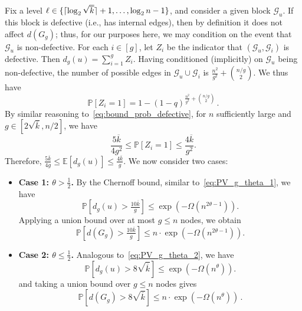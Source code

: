 \documentclass[journal]{IEEEtran}
\theoremstyle{definition}
\theoremstyle{definition}
\newcommand{\Gc}{\mathcal{G}}
\newcommand{\EE}{\mathbb{E}}
\newcommand{\PP}{\mathbb{P}}
\newcommand{\kb}{\overline{k}}
\DeclarePairedDelimiter\ceil{\lceil}{\rceil}
\begin{document}
Fix a level $\ell \in \{ \ceil{\log_2 \sqrt{\kb}}+1,\dots, \log_2 n -1 \}$, and consider a given block $\Gc_u$.  If this block is defective (i.e., has internal edges), then by definition it does not affect $d(G_g)$; thus, for our purposes here, we may condition on the event that $\Gc_u$ is non-defective.   
For each $i \in [g]$, let $Z_i$ be the indicator that $(\Gc_u,\Gc_i)$ is defective.  
Then $d_g(u) = \sum_{i=1}^g Z_i$.  
Having conditioned (implicitly) on $\Gc_u$ being non-defective, the number of possible edges in $\Gc_u \cup \Gc_i$ is $\tfrac{n^2}{g^2} + \binom{n/g}{2}$. We thus have 
\[
\PP[Z_i = 1] = 1 - (1-q)^{\tfrac{n^2}{g^2} + \binom{n/g}{2}} \, .
\] 
By similar reasoning to~\eqref{eq:bound_prob_defective}, for $n$ sufficiently large and $g \in [2\sqrt{\kb},n/2]$, we have
\[
  \frac{5\kb}{4g^2} \leq \PP[Z_i=1] \leq \frac{4\kb}{g^2}.
\]
Therefore, $\frac{5\kb}{4g} \leq \EE[d_g(u)] \leq \frac{4\kb}{g}$. We now consider two cases:
\begin{itemize}
    \item {
    \textbf{Case 1: $\theta > \tfrac{1}{2}$.} By the Chernoff bound, similar to~\eqref{eq:PV_g_theta_1}, we have
\[
  \PP \left[d_g(u) > \tfrac{10\kb}{g}\right] \leq \exp \left(-\Omega(n^{2\theta-1}) \right).
\]
Applying a union bound over at most $g \leq n$ nodes, we obtain
\[
  \PP[d(G_g) > \tfrac{10\kb}{g}] \leq n \cdot \exp \left(-\Omega(n^{2\theta-1}) \right).
\]
    }
\item{
\textbf{Case 2: $\theta \leq \tfrac{1}{2}$.}  
Analogous to~\eqref{eq:PV_g_theta_2}, we have
\[
  \PP[d_g(u) > 8\sqrt{\kb}] \leq \exp \left( - \Omega(n^\theta)\right).
\]
and taking a union bound over $g \leq n$ nodes gives
\[
  \PP[d(G_g) > 8\sqrt{\kb}] \leq n \cdot \exp \left( - \Omega(n^\theta)\right) \, .
\]
}
    
\end{itemize}


\end{document}
